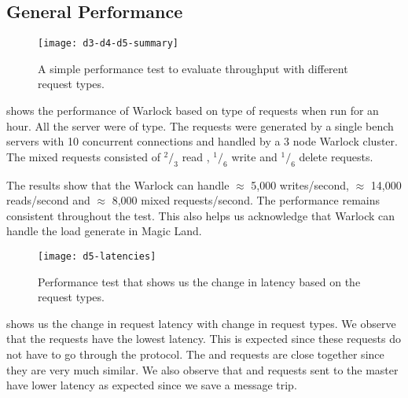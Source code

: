 \subsection{General Performance}

\begin{figure}
  \begin{whole}
    \texttt{[image: d3-d4-d5-summary]}
    \caption[General Performance Throughput Test]{%
      A simple performance test to evaluate throughput with different request
    types.}
    \label{figure:res.general.performance}
  \end{whole}
\end{figure}

 shows the performance of Warlock based on
type of requests when run for an hour. All the server were of 
type. The requests were generated by a single bench servers with 10 concurrent
connections and handled by a 3 node Warlock cluster. The mixed requests 
consisted of ${}^2/_3$ read , ${}^1/_6$ write and ${}^1/_6$ delete requests.

The results show that the Warlock can handle $\approx$ 5,000 writes/second, 
$\approx$ 14,000 reads/second and $\approx$ 8,000 mixed requests/second. The
performance remains consistent throughout the test. This also helps us
acknowledge that Warlock can handle the load generate in Magic Land.

\begin{figure}
  \begin{whole}
    \texttt{[image: d5-latencies]}
    \caption[General Performance Latency Test]{%
      Performance test that shows us the change in latency based on the request
      types.
    }
    \label{figure:res.general.latency}
  \end{whole}
\end{figure}

 shows us the change in request latency%
 with change in request types. We observe that the  requests have the
lowest latency. This is expected since these requests do not have to go through
the protocol. The  and  requests are close together since
they are very much similar. We also observe that  and  
requests sent to the master have lower latency as expected since we save a
message trip.

